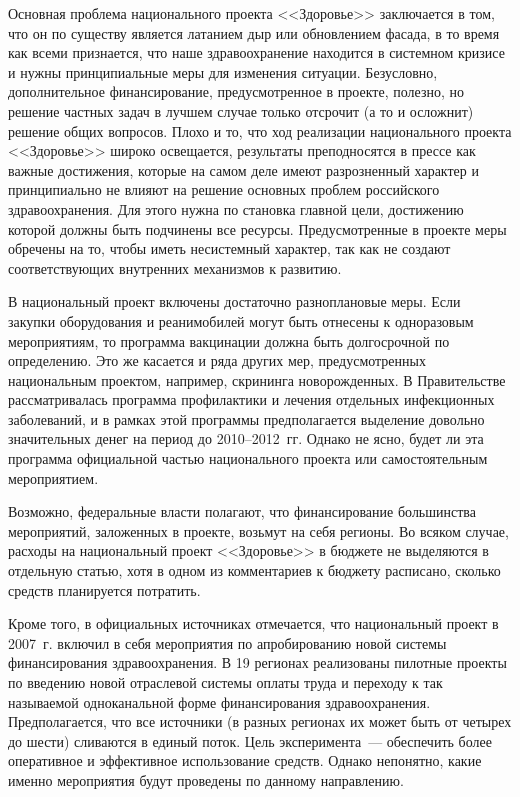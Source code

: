 \documentclass[article, 12pt, russian, oneside]{ncc}
\begin{document}
Основная проблема национального проекта <<Здоровье>> заключается в
том, что он по существу является латанием дыр или обновлением фасада,
в то время как всеми признается, что наше здравоохранение находится в
системном кризисе и нужны принципиальные меры для изменения ситуации.
Безусловно, дополнительное финансирование, предусмотренное в проекте,
полезно, но решение частных задач в лучшем случае только отсрочит (а
то и осложнит) решение общих вопросов. Плохо и то, что ход реализации
национального проекта <<Здоровье>> широко освещается, результаты
преподносятся в прессе как важные достижения, которые на самом деле
имеют разрозненный характер и принципиально не влияют на решение
основных проблем российского здравоохранения. Для этого нужна по
становка главной цели, достижению которой должны быть подчинены все
ресурсы. Предусмотренные в проекте меры обречены на то, чтобы иметь
несистемный характер, так как не создают соответствующих внутренних
механизмов к развитию.
     
В национальный проект включены достаточно разноплановые меры. Если
закупки оборудования и реанимобилей могут быть отнесены к одноразовым
мероприятиям, то программа вакцинации должна быть долгосрочной по
определению. Это же касается и ряда других мер, предусмотренных
национальным проектом, например, скрининга новорожденных. В
Правительстве рассматривалась программа профилактики и лечения
отдельных инфекционных заболеваний, и в рамках этой программы
предполагается выделение довольно значительных денег на период до
2010--2012~гг. Однако не ясно, будет ли эта программа официальной
частью национального проекта или самостоятельным мероприятием.
     
Возможно, федеральные власти полагают, что финансирование большинства
мероприятий, заложенных в проекте, возьмут на себя регионы.  Во всяком
случае, расходы на национальный проект <<Здоровье>> в бюджете не
выделяются в отдельную статью, хотя в одном из комментариев к бюджету
расписано, сколько средств планируется потратить.
     
Кроме того, в официальных источниках отмечается, что национальный
проект в 2007~г. включил в себя мероприятия по апробированию новой
системы финансирования здравоохранения. В 19 регионах реализованы
пилотные проекты по введению новой отраслевой системы оплаты труда и
переходу к так называемой одноканальной форме финансирования
здравоохранения. Предполагается, что все источники (в разных регионах
их может быть от четырех до шести) сливаются в единый поток. Цель
эксперимента~--- обеспечить более оперативное и эффективное
использование средств. Однако непонятно, какие именно мероприятия
будут проведены по данному направлению.
\end{document}

